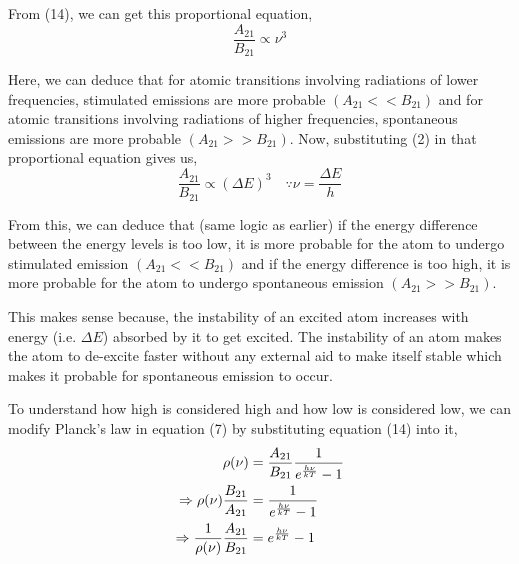 \documentclass[12pt]{article}
\begin{document}
From (14), we can get this proportional equation,
\begin{equation*}
    \frac{A_{21}}{B_{21}} \propto \nu^{3}
\end{equation*}

Here, we can deduce that for atomic transitions involving radiations of lower frequencies, stimulated emissions are more probable $(A_{21} << B_{21})$ and for atomic transitions involving radiations of higher frequencies, spontaneous emissions are more probable $(A_{21} >> B_{21})$. Now, substituting (2) in that proportional equation gives us,
\begin{equation}
    \frac{A_{21}}{B_{21}} \propto (\Delta E)^{3} \quad \because \nu = \frac{\Delta E}{h}
\end{equation}

From this, we can deduce that (same logic as earlier) if the energy difference between the energy levels is too low, it is more probable for the atom to undergo stimulated emission $(A_{21} << B_{21})$ and if the energy difference is too high, it is more probable for the atom to undergo spontaneous emission $(A_{21} >> B_{21})$. \vspace{.2cm}

This makes sense because, the instability of an excited atom increases with energy (i.e. $\Delta E$) absorbed by it to get excited. The instability of an atom makes the atom to de-excite faster without any external aid to make itself stable which makes it probable for spontaneous emission to occur. \vspace{.2cm}

To understand how high is considered high and how low is considered low, we can modify Planck's law in equation (7) by substituting equation (14) into it,
\begin{align}
    \rho(\nu) & = \frac{A_{21}}{B_{21}} \frac{1}{e^\frac{h\nu}{kT} - 1} \notag \\
    \Rightarrow \rho(\nu) \frac{B_{21}}{A_{21}} & = \frac{1}{e^\frac{h\nu}{kT} - 1} \notag \\
    \Rightarrow \frac{1}{\rho(\nu)} \frac{A_{21}}{B_{21}} & = e^\frac{h\nu}{kT} - 1
\end{align} \vspace{.2cm}
\end{document}
